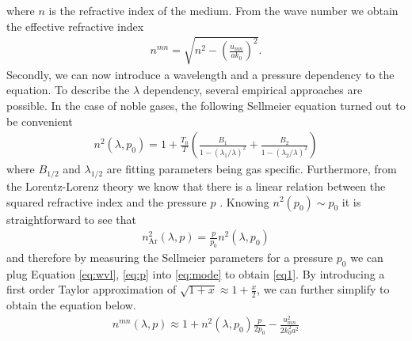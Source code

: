 \documentclass[fleqn, 10pt, twocolumn]{SelfArx}
\begin{document}
    where $n$ is the refractive index of the medium.
    From the wave number we obtain the effective refractive index 
    \begin{align}
        n^{mn} = \sqrt{n^2 - \left( \frac{u_{mn}}{a k_0}\right)^2}.
        \label{eq:mode}
    \end{align}
    Secondly, we can now introduce a wavelength and a pressure dependency to the equation. To describe the $\lambda$ dependency, several empirical approaches are possible. 
    In the case of noble gases, the following Sellmeier equation turned out to be convenient \cite{Borzsonyi2008}
    \begin{align}
       n^2(\lambda, p_0)  = 1 + \frac{T_0}{T} \left(\frac{B_1}{1- (\lambda_1/\lambda)^2} + \frac{B_2}{1- (\lambda_2/\lambda)^2}  \right)
        \label{eq:wvl}
    \end{align}
    where $B_{1/2}$ and $\lambda_{1/2}$ are fitting parameters being gas specific.
    Furthermore, from the Lorentz-Lorenz theory
    we know that there is a linear relation between the squared refractive index and the pressure $p$ \cite{Borzsonyi2008}.
    Knowing $n^2(p_0) \sim p_0$ it is straightforward to see that
    \begin{align}
        n_{\text{Ar}}^2(\lambda, p) = \frac{p}{p_0} n^2(\lambda, p_0)
        \label{eq:p}
    \end{align}
    and therefore by measuring the Sellmeier parameters for a pressure $p_0$ we can plug Equation \ref{eq:wvl}, \ref{eq:p} into \ref{eq:mode} to obtain \eqref{eq1}. 
    By introducing a first order Taylor approximation of $\sqrt{1+x} \approx 1 + \frac{x}{2}$, we can further simplify to obtain the equation below.
    \begin{align}
        n^{mn}(\lambda, p) \approx 1 + n^2(\lambda, p_0) \frac{p}{2p_0} -  \frac{u_{mn}^2}{2 k_0^2 a^2}
        \label{eq1a}
    \end{align}
\end{document}
